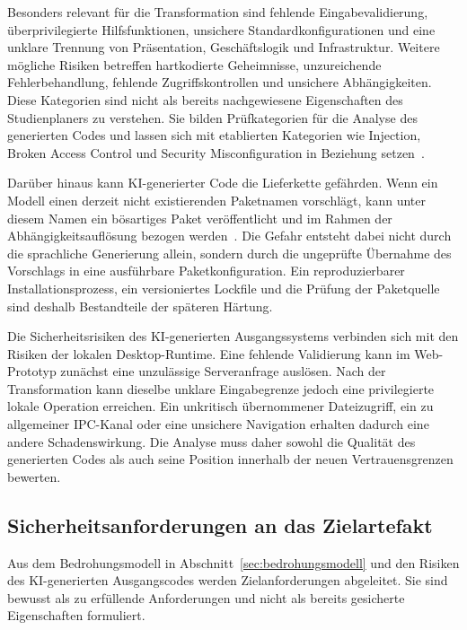 Besonders relevant für die Transformation sind fehlende Eingabevalidierung, überprivilegierte Hilfsfunktionen, unsichere Standardkonfigurationen und eine unklare Trennung von Präsentation, Geschäftslogik und Infrastruktur.
Weitere mögliche Risiken betreffen hartkodierte Geheimnisse, unzureichende Fehlerbehandlung, fehlende Zugriffskontrollen und unsichere Abhängigkeiten.
Diese Kategorien sind nicht als bereits nachgewiesene Eigenschaften des Studienplaners zu verstehen.
Sie bilden Prüfkategorien für die Analyse des generierten Codes und lassen sich mit etablierten Kategorien wie Injection, Broken Access Control und Security Misconfiguration in Beziehung setzen~\cite{owasp2025top10}.

Darüber hinaus kann KI-generierter Code die Lieferkette gefährden.
Wenn ein Modell einen derzeit nicht existierenden Paketnamen vorschlägt, kann unter diesem Namen ein bösartiges Paket veröffentlicht und im Rahmen der Abhängigkeitsauflösung bezogen werden~\cite{spracklen2025package}.
Die Gefahr entsteht dabei nicht durch die sprachliche Generierung allein, sondern durch die ungeprüfte Übernahme des Vorschlags in eine ausführbare Paketkonfiguration.
Ein reproduzierbarer Installationsprozess, ein versioniertes Lockfile und die Prüfung der Paketquelle sind deshalb Bestandteile der späteren Härtung.

Die Sicherheitsrisiken des KI-generierten Ausgangssystems verbinden sich mit den Risiken der lokalen Desktop-Runtime.
Eine fehlende Validierung kann im Web-Prototyp zunächst eine unzulässige Serveranfrage auslösen.
Nach der Transformation kann dieselbe unklare Eingabegrenze jedoch eine privilegierte lokale Operation erreichen.
Ein unkritisch übernommener Dateizugriff, ein zu allgemeiner IPC-Kanal oder eine unsichere Navigation erhalten dadurch eine andere Schadenswirkung.
Die Analyse muss daher sowohl die Qualität des generierten Codes als auch seine Position innerhalb der neuen Vertrauensgrenzen bewerten.
\subsection{Sicherheitsanforderungen an das Zielartefakt}
\label{sec:sicherheitsanforderungen}
Aus dem Bedrohungsmodell in Abschnitt~\ref{sec:bedrohungsmodell} und den Risiken des KI-generierten Ausgangscodes werden Zielanforderungen abgeleitet.
Sie sind bewusst als zu erfüllende Anforderungen und nicht als bereits gesicherte Eigenschaften formuliert.

